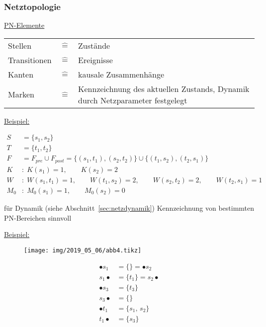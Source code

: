 \subsubsection{Netztopologie}

\underline{PN-Elemente} 

\begin{tabularx}{0.9\linewidth}{p{2.1cm}p{0.1cm}X}
	Stellen & $\mathrel{\hat{=}}$ & Zustände \\
	Transitionen & $\mathrel{\hat{=}}$ & Ereignisse \\
	Kanten & $\mathrel{\hat{=}}$ & kausale Zusammenhänge \\
	Marken & $\mathrel{\hat{=}}$ & Kennzeichnung des aktuellen Zustands, Dynamik durch Netzparameter festgelegt \\
\end{tabularx}

\underline{Beispiel:}

\begin{subequations}
	\begin{align}
	S &= \{ s_1, s_2 \} \\
	T &= \{ t_1, t_2 \} \\
	F &= F_{pre} \cup F_{post} = \{ (s_1, t_1), (s_2,t_2) \} \cup \{(t_1, s_2), (t_2, s_1) \} \\
	K&:\; K(s_1)=1, \qquad K(s_2)=2 \\
	W&:\; W(s_1,t_1)=1, \qquad W(t_1,s_2)=2, \qquad W(s_2,t_2)=2, \qquad W(t_2,s_1)=1 \\
	M_0&:\; M_0(s_1)=1, \qquad M_0(s_2)=0
	\end{align}
\end{subequations}


für Dynamik (siehe Abschnitt~\ref{sec:netzdynamik}) Kennzeichnung von bestimmten PN-Bereichen sinnvoll 

\underline{Beispiel: }

\begin{figure}[H]
	\centering
	\texttt{[image: img/2019\_05\_06/abb4.tikz]}
\end{figure}

\begin{align}
	\bullet s_1 &= \{\} = \bullet s_2 \\
	s_1 \bullet &= \{t_1\} = s_2 \bullet \\
	\bullet s_3 &= \{t_3\} \\
	s_3 \bullet &= \{\} \\
	\bullet t_1 &= \{s_1,\, s_2\} \\
	t_1 \bullet &= \{s_3\}
\end{align}

